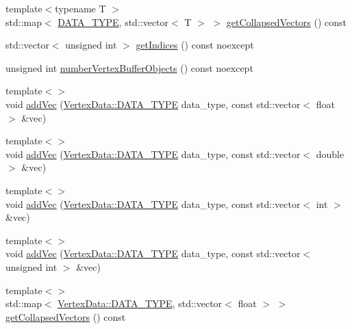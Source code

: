 \begin{DoxyCompactItemize}
{\footnotesize template$<$typename T $>$ }\\std\+::map$<$ \hyperlink{class_graphics_1_1_vertex_data_a50e88236939dc2a3ec4df7aeb728620e}{D\+A\+T\+A\+\_\+\+T\+Y\+P\+E}, std\+::vector$<$ T $>$ $>$ \hyperlink{class_graphics_1_1_vertex_data_a860575a29aa889f2a1028f2b8a255adc}{get\+Collapsed\+Vectors} () const 
\item 
std\+::vector$<$ unsigned int $>$ \hyperlink{class_graphics_1_1_vertex_data_a39b62d7b756b924aed1025d725a2316a}{get\+Indices} () const noexcept
\item 
unsigned int \hyperlink{class_graphics_1_1_vertex_data_ae46d393d65961b336a380d22bc8e39cb}{number\+Vertex\+Buffer\+Objects} () const noexcept
\item 
{\footnotesize template$<$$>$ }\\void \hyperlink{class_graphics_1_1_vertex_data_a3c16815abdf03faa1789af508f378b4a}{add\+Vec} (\hyperlink{class_graphics_1_1_vertex_data_a50e88236939dc2a3ec4df7aeb728620e}{Vertex\+Data\+::\+D\+A\+T\+A\+\_\+\+T\+Y\+P\+E} data\+\_\+type, const std\+::vector$<$ float $>$ \&vec)
\item 
{\footnotesize template$<$$>$ }\\void \hyperlink{class_graphics_1_1_vertex_data_a718710cb36c77da3ce7202fbf78f9dcf}{add\+Vec} (\hyperlink{class_graphics_1_1_vertex_data_a50e88236939dc2a3ec4df7aeb728620e}{Vertex\+Data\+::\+D\+A\+T\+A\+\_\+\+T\+Y\+P\+E} data\+\_\+type, const std\+::vector$<$ double $>$ \&vec)
\item 
{\footnotesize template$<$$>$ }\\void \hyperlink{class_graphics_1_1_vertex_data_addc04a692143dbd59ef3eb1b9107afc9}{add\+Vec} (\hyperlink{class_graphics_1_1_vertex_data_a50e88236939dc2a3ec4df7aeb728620e}{Vertex\+Data\+::\+D\+A\+T\+A\+\_\+\+T\+Y\+P\+E} data\+\_\+type, const std\+::vector$<$ int $>$ \&vec)
\item 
{\footnotesize template$<$$>$ }\\void \hyperlink{class_graphics_1_1_vertex_data_ad5b58302a2e592db88a896f8e8cbd83d}{add\+Vec} (\hyperlink{class_graphics_1_1_vertex_data_a50e88236939dc2a3ec4df7aeb728620e}{Vertex\+Data\+::\+D\+A\+T\+A\+\_\+\+T\+Y\+P\+E} data\+\_\+type, const std\+::vector$<$ unsigned int $>$ \&vec)
\item 
{\footnotesize template$<$$>$ }\\std\+::map$<$ \hyperlink{class_graphics_1_1_vertex_data_a50e88236939dc2a3ec4df7aeb728620e}{Vertex\+Data\+::\+D\+A\+T\+A\+\_\+\+T\+Y\+P\+E}, std\+::vector$<$ float $>$ $>$ \hyperlink{class_graphics_1_1_vertex_data_a248ab37b8eec5e4befba68c09a56fc1b}{get\+Collapsed\+Vectors} () const 

\end{DoxyCompactItemize}
